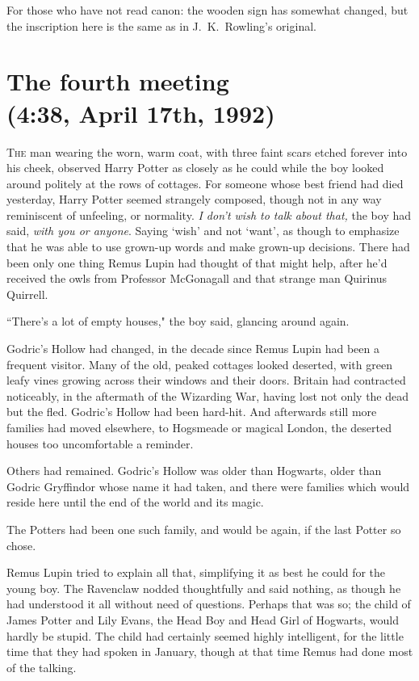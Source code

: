 
\begin{chapterOpeningAuthorNote}
For those who have not read canon: the wooden sign has somewhat changed, but the inscription here is the same as in J.~K.~Rowling's original.
\end{chapterOpeningAuthorNote}

\section{The fourth meeting\\
(4:38\pm, April 17th, 1992)}

\lettrine{T}{he} man wearing the worn, warm coat, with three faint scars etched forever into his cheek, observed Harry Potter as closely as he could while the boy looked around politely at the rows of cottages. For someone whose best friend had died yesterday, Harry Potter seemed strangely composed, though not in any way reminiscent of unfeeling, or normality. \emph{I don't wish to talk about that,} the boy had said, \emph{with you or anyone}. Saying `wish' and not `want', as though to emphasize that he was able to use grown-up words and make grown-up decisions. There had been only one thing Remus Lupin had thought of that might help, after he'd received the owls from Professor McGonagall and that strange man Quirinus Quirrell.

``There's a lot of empty houses," the boy said, glancing around again.

Godric's Hollow had changed, in the decade since Remus Lupin had been a frequent visitor. Many of the old, peaked cottages looked deserted, with green leafy vines growing across their windows and their doors. Britain had contracted noticeably, in the aftermath of the Wizarding War, having lost not only the dead but the fled. Godric's Hollow had been hard-hit. And afterwards still more families had moved elsewhere, to Hogsmeade or magical London, the deserted houses too uncomfortable a reminder.

Others had remained. Godric's Hollow was older than Hogwarts, older than Godric Gryffindor whose name it had taken, and there were families which would reside here until the end of the world and its magic.

The Potters had been one such family, and would be again, if the last Potter so chose.

Remus Lupin tried to explain all that, simplifying it as best he could for the young boy. The Ravenclaw nodded thoughtfully and said nothing, as though he had understood it all without need of questions. Perhaps that was so; the child of James Potter and Lily Evans, the Head Boy and Head Girl of Hogwarts, would hardly be stupid. The child had certainly seemed highly intelligent, for the little time that they had spoken in January, though at that time Remus had done most of the talking.

